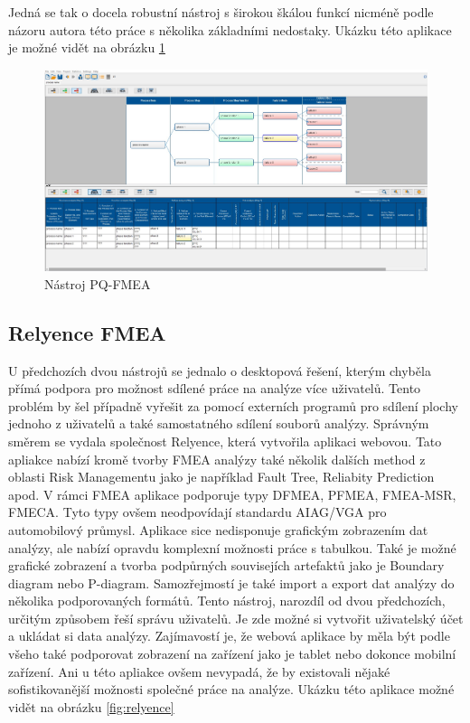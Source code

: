 Jedná se tak o docela robustní nástroj s širokou škálou funkcí nicméně podle názoru autora této práce s několika základními nedostaky. Ukázku této aplikace je možné vidět na obrázku \ref{fig:pq}

\begin{figure}[h]
\centering
	\includegraphics[width=1.0\textwidth]{Figures/pq.jpg}
	\caption{Nástroj PQ-FMEA }
	\label{fig:pq}
\end{figure}

\subsection{Relyence FMEA}
\cite{relyenceFMEA}U předchozích dvou nástrojů se jednalo o desktopová řešení, kterým chyběla přímá podpora pro možnost sdílené práce na analýze více uživatelů. Tento problém by šel případně vyřešit za pomocí externích programů pro sdílení plochy jednoho z uživatelů a také samostatného sdílení souborů analýzy. Správným směrem se vydala společnost Relyence, která vytvořila aplikaci webovou. Tato apliakce nabízí kromě tvorby FMEA analýzy také několik dalších method z oblasti Risk Managementu jako je například Fault Tree, Reliabity Prediction apod. V rámci FMEA aplikace podporuje typy DFMEA, PFMEA, FMEA-MSR, FMECA. Tyto typy ovšem neodpovídají standardu AIAG/VGA pro automobilový průmysl. Aplikace sice nedisponuje grafickým zobrazením dat analýzy, ale nabízí opravdu komplexní možnosti práce s tabulkou. Také je možné grafické zobrazení a tvorba podpůrných souvisejích artefaktů jako je Boundary diagram nebo P-diagram. Samozřejmostí je také import a export dat analýzy do několika podporovaných formátů. Tento nástroj, narozdíl od dvou předchozích, určitým způsobem řeší správu uživatelů. Je zde možné si vytvořit uživatelský účet a ukládat si data analýzy. Zajímavostí je, že webová aplikace by měla být podle všeho také podporovat zobrazení na zařízení jako je tablet nebo dokonce mobilní zařízení. Ani u této apliakce ovšem nevypadá, že by existovali nějaké sofistikovanější možnosti společné práce na analýze. Ukázku této aplikace možné vidět na obrázku  \ref{fig:relyence}

